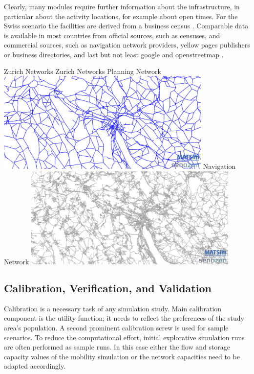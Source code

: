 Clearly, many modules require further information about the infrastructure, in particular about the activity locations, for example about open times. For the Swiss scenario the facilities are derived from a business census \citep[][]{}. Comparable data is available in most countries from official sources, such as censuses, and commercial sources, such as navigation network providers, yellow pages publishers or business directories, and last but not least google and openstreetmap \citep[][]{OpenStreetMap_Webpage_2015}.

\createfigure%
{Zurich Networks}%
{Zurich Networks}%
{\label{fig:zhnetwork}}%
{%
  \createsubfigure%
  {Planning Network}%
  {\includegraphics[width=0.8\textwidth,angle=0]{using/figures/planning.png}}%
  {\label{fig:planningnetwork}}%
  {}%
  \createsubfigure%
  {Navigation Network}%
	{\includegraphics[width=0.8\textwidth,angle=0]{using/figures/navigation.png}}%
  {\label{fig:navigationnetwork}}%
  {}%
}%
{}

\subsection{Calibration, Verification, and Validation}
Calibration is a necessary task of any simulation study. Main calibration component is the utility function; it needs to reflect the preferences of the study area's population. A second prominent calibration screw is used for sample scenarios. To reduce the computational effort, initial explorative simulation runs are often performed as sample runs. In this case either the flow and storage capacity values of the mobility simulation or the network capacities need to be adapted accordingly.

